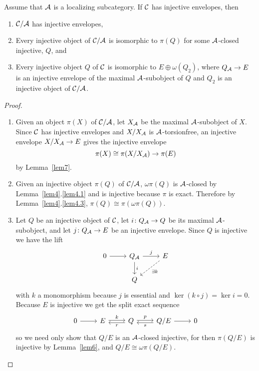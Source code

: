\documentclass[dissertation.tex]{subfiles}
\begin{document}
\begin{prop}\label{prop1}
  Assume that $\mathcal{A}$ is a localizing subcategory.
  If $\mathcal{C}$ has injective envelopes, then
  \begin{enumerate}
  \item
    $\mathcal{C}/\mathcal{A}$ has injective envelopes,
  \item
    Every injective object of $\mathcal{C}/\mathcal{A}$ is isomorphic to $\pi(Q)$ for some $\mathcal{A}$-closed injective, $Q$, and
  \item
    Every injective object $Q$ of $\mathcal{C}$ is isomorphic to $E \oplus \omega(Q_2)$, where $Q_{\mathcal{A}} \rightarrow E$ is an injective envelope of the maximal $\mathcal{A}$-subobject of $Q$ and $Q_2$ is an injective object of $\mathcal{C}/\mathcal{A}$.
  \end{enumerate}
  
  \begin{proof}
    \begin{enumerate}
    \item
      Given an object $\pi(X)$ of $\mathcal{C}/\mathcal{A}$, let $X_{\mathcal{A}}$ be the maximal $\mathcal{A}$-subobject of $X$.
      Since $\mathcal{C}$ has injective envelopes and $X/X_{\mathcal{A}}$ is $\mathcal{A}$-torsionfree, an injective envelope $X/X_{\mathcal{A}} \rightarrow E$ gives the injective envelope
      $$\pi(X) \cong \pi(X/X_{\mathcal{A}}) \rightarrow \pi(E)$$
      by Lemma~\ref{lem7}.
    \item
      Given an injective object $\pi(Q)$ of $\mathcal{C}/\mathcal{A}$, $\omega\pi(Q)$ is $\mathcal{A}$-closed by Lemma~\ref{lem4}.\ref{lem4.1} and is injective because $\pi$ is exact.
      Therefore by Lemma~\ref{lem4}.\ref{lem4.3}, $\pi(Q) \cong \pi(\omega\pi(Q))$.
    \item
      Let $Q$ be an injective object of $\mathcal{C}$, let $i \colon Q_{\mathcal{A}} \rightarrow Q$ be its maximal $\mathcal{A}$-subobject, and let $j \colon Q_{\mathcal{A}} \rightarrow E$ be an injective envelope.
      Since $Q$ is injective we have the lift
      $$\begin{tikzcd}
        0 \arrow{r} & Q_\A \arrow{r}{j} \arrow{d}{i}& E \arrow[dashed]{ld}{\exists k}\\
        & Q
      \end{tikzcd}$$
      with $k$ a monomorphism because $j$ is essential and $\ker{(k \circ j)} = \ker{i} = 0$.
      Because $E$ is injective we get the split exact sequence
      $$\begin{tikzcd}
        0 \arrow{r} & E \arrow[shift left=0.5]{r}{k} & Q \arrow[shift left=0.5]{r}{p}\arrow[shift left=0.5ex]{l}{r} & Q/E \arrow[shift left=0.5ex]{l}{s} \arrow{r} & 0
      \end{tikzcd}$$
      so we need only show that $Q/E$ is an $\mathcal{A}$-closed injective, for then $\pi(Q/E)$ is injective by Lemma~\ref{lem6}, and $Q/E \cong \omega\pi(Q/E)$. 
      

\end{enumerate}
\end{proof}
\end{prop}
\end{document}
